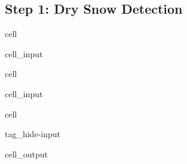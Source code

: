 \documentclass[letterpaper,10pt,english]{jupyterBook}
\begin{document}
\subsection{Step 1: Dry Snow Detection}
\label{\detokenize{algorithm/CIMR_L2_TSA_SCEPS:step-1-dry-snow-detection}}
\begin{sphinxuseclass}{cell}\begin{sphinxVerbatimInput}

\begin{sphinxuseclass}{cell_input}
\begin{sphinxVerbatim}[commandchars=\\\{\}]
    
\end{sphinxVerbatim}

\end{sphinxuseclass}\end{sphinxVerbatimInput}

\end{sphinxuseclass}
\begin{sphinxuseclass}{cell}\begin{sphinxVerbatimInput}

\begin{sphinxuseclass}{cell_input}
\begin{sphinxVerbatim}[commandchars=\\\{\}]
  
  
\end{sphinxVerbatim}

\end{sphinxuseclass}\end{sphinxVerbatimInput}

\end{sphinxuseclass}
\begin{sphinxuseclass}{cell}
\begin{sphinxuseclass}{tag_hide-input}\begin{sphinxVerbatimOutput}

\begin{sphinxuseclass}{cell_output}
\noindent{}

\end{sphinxuseclass}\end{sphinxVerbatimOutput}

\end{sphinxuseclass}
\end{sphinxuseclass}
\end{document}
